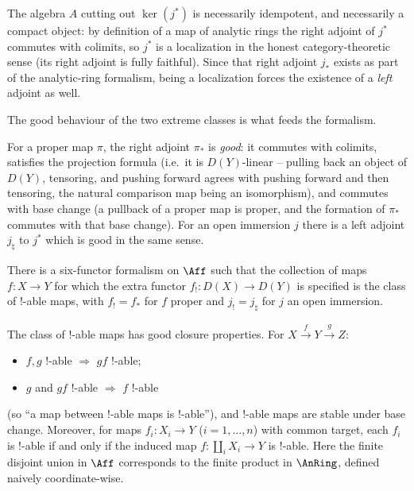 \begin{remark}
\label{rmk:17:idempotent-algebra}
The algebra $A$ cutting out $\ker(j^{*})$ is necessarily idempotent, and necessarily a
compact object: by definition of a map of analytic rings the right adjoint of $j^{*}$
commutes with colimits, so $j^{*}$ is a localization in the honest category-theoretic
sense (its right adjoint is fully faithful). Since that right adjoint $j_{*}$ exists as
part of the analytic-ring formalism, being a localization forces the existence of a
\emph{left} adjoint as well.
\end{remark}

The good behaviour of the two extreme classes is what feeds the formalism.

\begin{remark}
\label{rmk:17:good}
For a proper map $\pi$, the right adjoint $\pi_{*}$ is \emph{good}: it commutes with
colimits, satisfies the projection formula (i.e.\ it is $D(Y)$-linear -- pulling back an
object of $D(Y)$, tensoring, and pushing forward agrees with pushing forward and then
tensoring, the natural comparison map being an isomorphism), and commutes with base
change (a pullback of a proper map is proper, and the formation of $\pi_{*}$ commutes
with that base change). For an open immersion $j$ there is a left adjoint $j_{\natural}$
to $j^{*}$ which is good in the same sense.
\end{remark}

\begin{theorem}
\label{thm:17:6ff}
There is a six-functor formalism on $\Aff$ such that the collection of maps
$f\colon X\to Y$ for which the extra functor
$f_{!}\colon D(X)\to D(Y)$ is specified is the class of $!$-able maps, with
$f_{!}=f_{*}$ for $f$ proper and $j_{!}=j_{\natural}$ for $j$ an open immersion.
\end{theorem}

\begin{remark}
\label{rmk:17:closure}
The class of $!$-able maps has good closure properties. For $X\xrightarrow{f}Y\xrightarrow{g}Z$:
\begin{itemize}
\item $f,g$ $!$-able $\Rightarrow$ $gf$ $!$-able;
\item $g$ and $gf$ $!$-able $\Rightarrow$ $f$ $!$-able
\end{itemize}
(so ``a map between $!$-able maps is $!$-able''), and $!$-able maps are stable under base
change. Moreover, for maps $f_{i}\colon X_{i}\to Y$ ($i=1,\dots,n$) with common target,
each $f_{i}$ is $!$-able if and only if the induced map
$f\colon\coprod_{i}X_{i}\to Y$ is $!$-able. Here the finite disjoint union in $\Aff$
corresponds to the finite product in $\AnRing$, defined naively coordinate-wise.
\end{remark}


